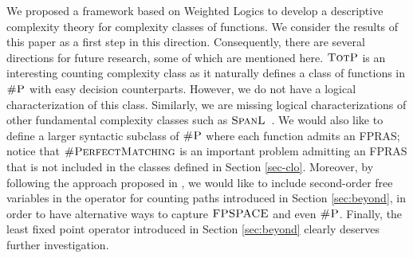 
We proposed a framework based on Weighted Logics to develop a descriptive complexity theory for complexity classes of functions.
We consider the results of this paper as a first step in this direction.
Consequently, there are several directions for future research, some of which are mentioned here. 
$\text{\sc TotP}$ is an interesting counting complexity class as it naturally defines a class of functions in $\text{\sc \#P}$ with easy decision counterparts. However, we do not have a logical characterization of this class.
Similarly, we are missing logical characterizations of other fundamental complexity classes such as $\text{\sc SpanL}$~\cite{AlvarezJ93}. We would also like to define a larger syntactic subclass of $\text{\sc \#P}$ where each function admits an FPRAS; notice that $\textsc{\#PerfectMatching}$ is an important problem admitting an FPRAS\cite{JSV04} that is not included in the classes defined in Section \ref{sec-clo}. Moreover, by following the approach proposed in
\cite{I83}, we would like to include second-order free variables in the operator for counting paths introduced in Section \ref{sec:beyond}, in order to have alternative ways to capture $\text{\sc FPSPACE}$ and even $\text{\sc \#P}$. Finally, the least fixed point operator introduced in Section \ref{sec:beyond} clearly deserves further investigation.


